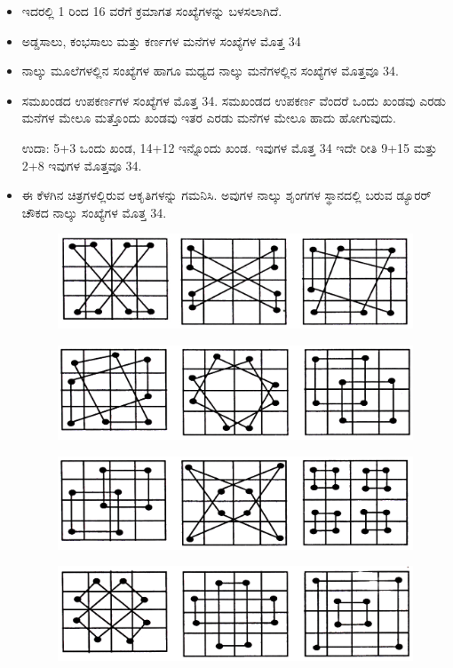 \begin{itemize}
	\item ಇದರಲ್ಲಿ 1 ರಿಂದ 16 ವರೆಗೆ ಕ್ರಮಾಗತ ಸಂಖ್ಯೆಗಳನ್ನು ಬಳಸಲಾಗಿದೆ.
	\item ಅಡ್ಡಸಾಲು, ಕಂಭಸಾಲು ಮತ್ತು ಕರ್ಣಗಳ ಮನೆಗಳ ಸಂಖ್ಯೆಗಳ ಮೊತ್ತ 34
	\item ನಾಲ್ಕು ಮೂಲೆಗಳಲ್ಲಿನ ಸಂಖ್ಯೆಗಳ ಹಾಗೂ ಮಧ್ಯದ ನಾಲ್ಕು ಮನೆಗಳಲ್ಲಿನ ಸಂಖ್ಯೆಗಳ ಮೊತ್ತವೂ 34.
	\item ಸಮಖಂಡದ ಉಪಕರ್ಣಗಳ ಸಂಖ್ಯೆಗಳ ಮೊತ್ತ 34. ಸಮಖಂಡದ ಉಪಕರ್ಣ ವೆಂದರೆ ಒಂದು ಖಂಡವು ಎರಡು ಮನೆಗಳ ಮೇಲೂ ಮತ್ತೊಂದು ಖಂಡವು ಇತರ ಎರಡು ಮನೆಗಳ ಮೇಲೂ ಹಾದು ಹೋಗುವುದು.

	ಉದಾ: 5+3 ಒಂದು ಖಂಡ, 14+12 ಇನ್ನೊಂದು ಖಂಡ. ಇವುಗಳ ಮೊತ್ತ 34 ಇದೇ ರೀತಿ 9+15 ಮತ್ತು 2+8 ಇವುಗಳ ಮೊತ್ತವೂ 34.
	\item ಈ ಕೆಳಗಿನ ಚಿತ್ರಗಳಲ್ಲಿರುವ ಆಕೃತಿಗಳನ್ನು ಗಮನಿಸಿ. ಅವುಗಳ ನಾಲ್ಕು ಶೃಂಗಗಳ ಸ್ಥಾನದಲ್ಲಿ ಬರುವ ಡ್ಯೂರರ್ ಚೌಕದ ನಾಲ್ಕು ಸಂಖ್ಯೆಗಳ ಮೊತ್ತ 34.
	\begin{figure}[H]
	\includegraphics{src/figures/chap4/fig4-16.jpg}
	\end{figure}
	\begin{figure}[H]
	\includegraphics{src/figures/chap4/fig4-17.jpg}
	\end{figure}
	\begin{figure}[H]
	\includegraphics{src/figures/chap4/fig4-18.jpg}
	\end{figure}
	\begin{figure}[H]
	\includegraphics{src/figures/chap4/fig4-19.jpg}
	\end{figure}


\end{itemize}
